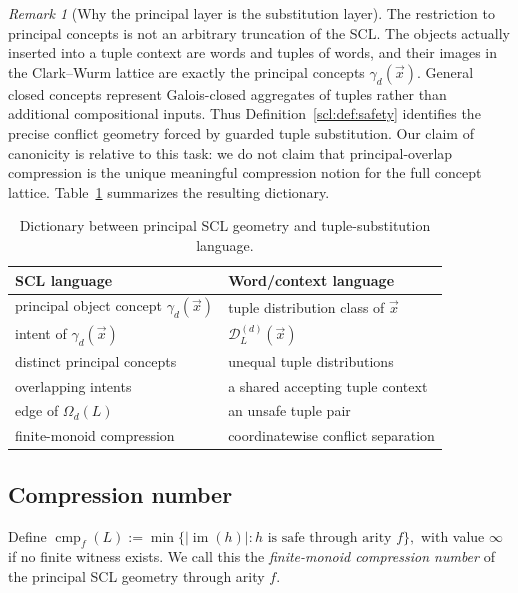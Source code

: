 \documentclass[10pt,a4paper]{article}
\theoremstyle{definition}
\theoremstyle{remark}
\newtheorem{remark}[theorem]{Remark}
\newcommand{\cmp}{\operatorname{cmp}}
\newcommand{\D}{\mathcal D}
\newcommand{\Om}{\Omega}
\begin{document}
\begin{remark}[Why the principal layer is the substitution layer]
\label{scl:rem:principal-canonical}
The restriction to principal concepts is not an arbitrary truncation of the
SCL.  The objects actually inserted into a tuple context are words and tuples
of words, and their images in the Clark--Wurm lattice are exactly the
principal concepts \(\gamma_d(\vec x)\).  General closed concepts represent
Galois-closed aggregates of tuples rather than additional compositional inputs.
Thus Definition~\ref{scl:def:safety} identifies the precise conflict
geometry forced by guarded tuple substitution.  Our claim of canonicity is
relative to this task: we do not claim that principal-overlap compression is
the unique meaningful compression notion for the full concept lattice.
Table~\ref{tab:scl-dictionary} summarizes the resulting dictionary.
\end{remark}

\begin{table}[t]
\centering
\caption{Dictionary between principal SCL geometry and tuple-substitution language.}
\label{tab:scl-dictionary}
\begin{tabular}{@{}ll@{}}
\toprule
\textbf{SCL language} & \textbf{Word/context language}\\
\midrule
principal object concept \(\gamma_d(\vec x)\) & tuple distribution class of \(\vec x\)\\
intent of \(\gamma_d(\vec x)\) & \(\D_L^{(d)}(\vec x)\)\\
distinct principal concepts & unequal tuple distributions\\
overlapping intents & a shared accepting tuple context\\
edge of \(\Om_d(L)\) & an unsafe tuple pair\\
finite-monoid compression & coordinatewise conflict separation\\
\bottomrule
\end{tabular}
\end{table}

\subsection{Compression number}

Define
\(
 \cmp_f(L)
 :=\min\{|\operatorname{im}(h)|:h\text{ is safe through arity }f\},
\)
with value \(\infty\) if no finite witness exists.  We call this the
\emph{finite-monoid compression number} of the principal SCL geometry through
arity \(f\).
\end{document}
